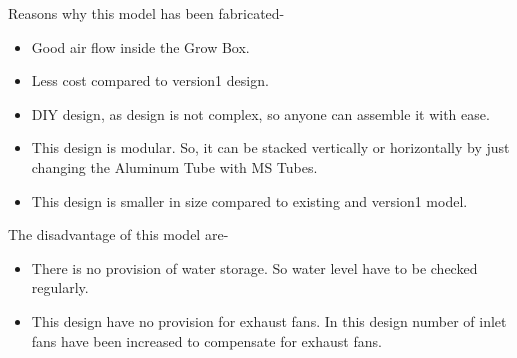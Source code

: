 \documentclass[a4paper,12pt,oneside]{book}
\begin{document}
Reasons why this model has been fabricated-
\begin{itemize}
    \item Good air flow inside the Grow Box.
    \item Less cost compared to version1 design.
    \item DIY design, as design is not complex, so anyone can assemble it with ease.
    \item This design is modular. So, it can be stacked vertically or horizontally by just changing the Aluminum Tube with MS Tubes.
    \item This design is smaller in size compared to existing and version1 model.
\end{itemize}
The disadvantage of this model are- 
\begin{itemize}
\item There is no provision of water storage. So water level have to be checked regularly. 
\item This design have no provision for exhaust fans. In this design number of inlet fans have been increased to compensate for exhaust fans.
\end{itemize}
\end{document}
